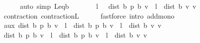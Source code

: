 \begin{isabellebody}
\ \ \ \ \isamarkupfalse%
\ {\isacharparenleft}{\kern0pt}auto\ simp{\isacharcolon}{\kern0pt}\ L{\isacharunderscore}{\kern0pt}eq{\isacharunderscore}{\kern0pt}{\isasymL}\isactrlsub b{\isacharparenright}{\kern0pt}\isanewline
\ \ \isamarkupfalse%
\ \isamarkupfalse%
\ {\isachardoublequoteopen}{\isasymdots}\ {\isasymle}\ l\ {\isacharasterisk}{\kern0pt}\ \ dist\ {\isacharparenleft}{\kern0pt}{\isasymnu}\isactrlsub b\ {\isacharquery}{\kern0pt}p{\isacharparenright}{\kern0pt}\ {\isacharparenleft}{\kern0pt}{\isasymL}\isactrlsub b\ v{\isacharparenright}{\kern0pt}\ {\isacharplus}{\kern0pt}\ l\ {\isacharasterisk}{\kern0pt}\ dist\ {\isacharparenleft}{\kern0pt}{\isasymL}\isactrlsub b\ v{\isacharparenright}{\kern0pt}\ v{\isachardoublequoteclose}\isanewline
\ \ \ \ \isamarkupfalse%
\ contraction{\isacharunderscore}{\kern0pt}{\isasymL}\ contraction{\isacharunderscore}{\kern0pt}L\isanewline
\ \ \ \ \isamarkupfalse%
\ {\isacharparenleft}{\kern0pt}fastforce\ intro{\isacharbang}{\kern0pt}{\isacharcolon}{\kern0pt}\ add{\isacharunderscore}{\kern0pt}mono{\isacharparenright}{\kern0pt}\isanewline
\ \ \isamarkupfalse%
\ \isamarkupfalse%
\ aux{\isacharcolon}{\kern0pt}\ {\isachardoublequoteopen}dist\ {\isacharparenleft}{\kern0pt}{\isasymnu}\isactrlsub b\ {\isacharquery}{\kern0pt}p{\isacharparenright}{\kern0pt}\ {\isacharparenleft}{\kern0pt}{\isasymL}\isactrlsub b\ v{\isacharparenright}{\kern0pt}\ {\isasymle}\ l\ {\isacharasterisk}{\kern0pt}\ dist\ {\isacharparenleft}{\kern0pt}{\isasymnu}\isactrlsub b\ {\isacharquery}{\kern0pt}p{\isacharparenright}{\kern0pt}\ {\isacharparenleft}{\kern0pt}{\isasymL}\isactrlsub b\ v{\isacharparenright}{\kern0pt}\ {\isacharplus}{\kern0pt}\ l\ {\isacharasterisk}{\kern0pt}\ dist\ {\isacharparenleft}{\kern0pt}{\isasymL}\isactrlsub b\ v{\isacharparenright}{\kern0pt}\ v{\isachardoublequoteclose}\ \isacommand{{\isachardot}{\kern0pt}}\isamarkupfalse%
\isanewline
\ \ \isamarkupfalse%
\ {\isachardoublequoteopen}dist\ {\isacharparenleft}{\kern0pt}{\isasymnu}\isactrlsub b\ {\isacharquery}{\kern0pt}p{\isacharparenright}{\kern0pt}\ {\isacharparenleft}{\kern0pt}{\isasymL}\isactrlsub b\ v{\isacharparenright}{\kern0pt}\ {\isacharminus}{\kern0pt}\ l\ {\isacharasterisk}{\kern0pt}\ dist\ {\isacharparenleft}{\kern0pt}{\isasymnu}\isactrlsub b\ {\isacharquery}{\kern0pt}p{\isacharparenright}{\kern0pt}\ {\isacharparenleft}{\kern0pt}{\isasymL}\isactrlsub b\ v{\isacharparenright}{\kern0pt}\ {\isasymle}\ l\ {\isacharasterisk}{\kern0pt}\ dist\ {\isacharparenleft}{\kern0pt}{\isasymL}\isactrlsub b\ v{\isacharparenright}{\kern0pt}\ v{\isachardoublequoteclose}\isanewline

\end{isabellebody}
